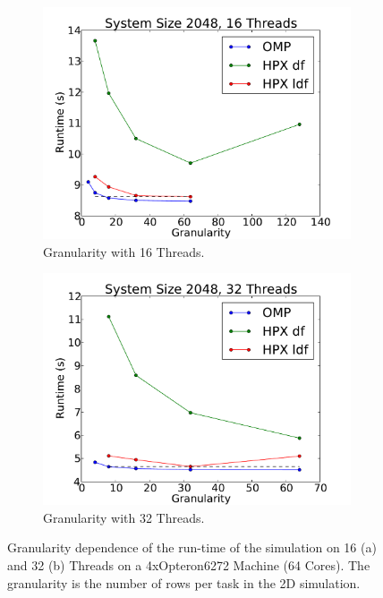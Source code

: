 \documentclass[a4wide,10pt]{scrartcl}
\begin{document}
\begin{figure}
 \begin{subfigure}[b]{0.49\textwidth}
  \centering
  \includegraphics[width=\textwidth]{../plot/trillian_granularity_16.pdf}\hfill
  \caption{Granularity with 16 Threads.} 
  \label{fig:granularity_16}
 \end{subfigure}
 \begin{subfigure}[b]{0.49\textwidth}
  \centering
  \includegraphics[width=\textwidth]{../plot/trillian_granularity_32.pdf}\hfill
  \caption{Granularity with 32 Threads.} 
  \label{fig:granularity_32}
 \end{subfigure}
 \caption{Granularity dependence of the run-time of the simulation on 16 (a) and 32 (b) Threads on a 4xOpteron6272 Machine (64 Cores). The granularity is the number of rows per task in the 2D simulation.}
\end{figure}
\end{document}
